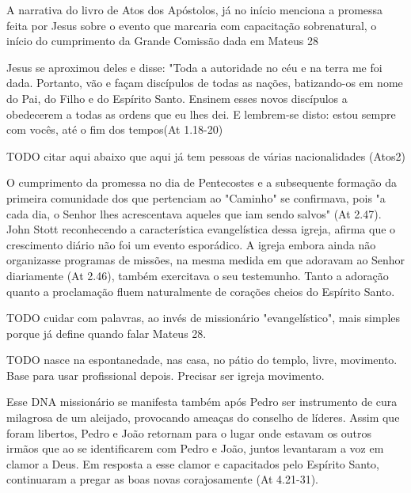 \documentclass[
	12pt,				%
	openright,			%
	twoside,			%
	a4paper,			%
	english,			%
	french,				%
	spanish,			%
	brazil				%
	]{abntex2}
\begin{document}

A narrativa do livro de Atos dos Apóstolos, já no início menciona a promessa feita por Jesus sobre o evento que marcaria com capacitação sobrenatural, o início do cumprimento da Grande Comissão dada em Mateus 28
\begin{citacao}
Jesus se aproximou deles e disse: "Toda a autoridade no céu e na terra me foi dada. Portanto, vão e façam discípulos de todas as nações, batizando-os em nome do Pai, do Filho e do Espírito Santo. Ensinem esses novos discípulos a obedecerem a todas as ordens que eu lhes dei. E lembrem-se disto: estou sempre com vocês, até o fim dos tempos(At 1.18-20)
\end{citacao}

TODO citar aqui abaixo que aqui já tem pessoas de várias nacionalidades (Atos2)

O cumprimento da promessa no dia de Pentecostes e a subsequente formação da primeira comunidade dos que pertenciam ao "Caminho" se confirmava, pois "a cada dia, o Senhor lhes acrescentava aqueles que iam sendo salvos" (At 2.47). John Stott reconhecendo a característica evangelística dessa igreja, afirma que o crescimento diário não foi um evento esporádico. A igreja embora ainda não organizasse programas de missões, na mesma medida em que adoravam ao Senhor diariamente (At 2.46), também exercitava o seu testemunho. Tanto a adoração quanto a proclamação fluem naturalmente de corações cheios do Espírito Santo. \cite[118-119]{stott}

TODO cuidar com palavras, ao invés de missionário "evangelístico", mais simples porque já define quando falar Mateus 28.

TODO nasce na espontanedade, nas casa, no pátio do templo, livre, movimento. Base para usar profissional depois. Precisar ser igreja movimento.

Esse DNA missionário se manifesta também após Pedro ser instrumento de cura milagrosa de um aleijado, provocando ameaças do conselho de líderes. Assim que foram libertos, Pedro e João retornam para o lugar onde estavam os outros irmãos que ao se identificarem com Pedro e João, juntos levantaram a voz em clamor a Deus. Em resposta a esse clamor e capacitados pelo Espírito Santo, continuaram a pregar as boas novas corajosamente (At 4.21-31).
\end{document}
